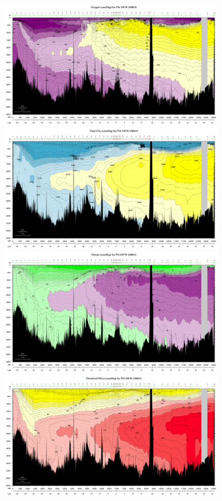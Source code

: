 \begin{figure}[hbt]
  \begin{center}
    \includegraphics{figs/WaterMasses/P16OxygenCrop}
    \includegraphics{figs/WaterMasses/P16CO2Crop}
    \includegraphics{figs/WaterMasses/P16NitrateCrop}
    \includegraphics{figs/WaterMasses/P16SilicaCrop}

\end{center}
\end{figure}
